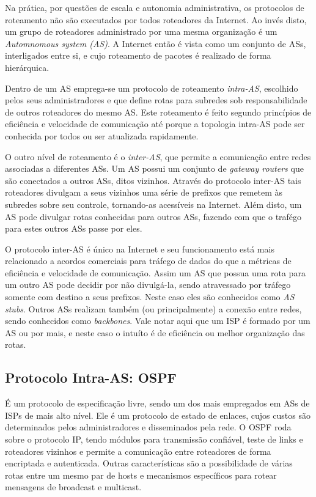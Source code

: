 Na prática, por questões de escala e autonomia administrativa, os protocolos de roteamento não são executados por todos roteadores da Internet.
Ao invés disto, um grupo de roteadores administrado por uma mesma organização é um \emph{Automnomous system (AS)}.
A Internet então é vista como um conjunto de ASs, interligados entre si, e cujo roteamento de pacotes é realizado de forma hierárquica.

Dentro de um AS emprega-se um protocolo de roteamento \emph{intra-AS}, escolhido pelos seus administradores 
e que define rotas para subredes sob responsabilidade de outros roteadores do mesmo AS.
Este roteamento é feito segundo princípios de eficiência e velocidade de comunicação até porque a topologia intra-AS pode ser conhecida por todos ou ser atualizada rapidamente.

O outro nível de roteamento é o \emph{inter-AS}, que permite a comunicação entre redes associadas a diferentes ASs.
Um AS possui um conjunto de \emph{gateway routers} que são conectados a outros ASs, ditos vizinhos.
Através do protocolo inter-AS tais roteadores divulgam a seus vizinhos 
uma série de prefixos que remetem às subredes sobre seu controle, tornando-as acessíveis na Internet.
Além disto, um AS pode divulgar rotas conhecidas para outros ASs, fazendo com que o trafégo para estes outros ASs passe por eles.

O protocolo inter-AS é único na Internet e seu funcionamento está mais relacionado a acordos comerciais para tráfego de dados do que a métricas de eficiência e velocidade de comunicação.
Assim um AS que possua uma rota para um outro AS pode decidir por não divulgá-la, sendo atravessado por tráfego somente com destino a seus prefixos.
Neste caso eles são conhecidos como \emph{AS stubs}.
Outros ASs realizam também (ou principalmente) a conexão entre redes, sendo conhecidos como \emph{backbones}.
Vale notar aqui que um ISP é formado por um AS ou por mais, e neste caso o intuíto é de eficiência ou melhor organização das rotas.

\subsection{Protocolo Intra-AS: OSPF}

É um protocolo de especificação livre, sendo um dos mais empregados em ASs de ISPs de mais alto nível.
Ele é um protocolo de estado de enlaces, cujos custos são determinados pelos administradores e disseminados pela rede.
O OSPF roda sobre o protocolo IP, tendo módulos para transmissão confiável, teste de links e roteadores vizinhos e
permite a comunicação entre roteadores de forma encriptada e autenticada.
Outras características são a possibilidade de várias rotas entre um mesmo par de hosts e mecanismos específicos para rotear mensagens de broadcast e multicast.

